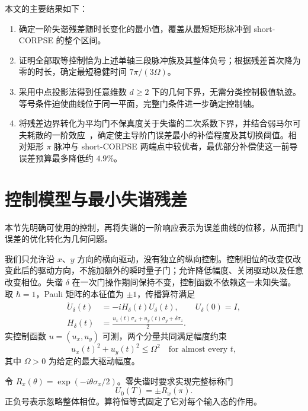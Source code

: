 \documentclass[12pt]{iopjournal}
\theoremstyle{definition}
\begin{document}
本文的主要结果如下：
\begin{enumerate}
\rightskip=0pt plus1fil
\item 确定一阶失谐残差随时长变化的最小值，覆盖从最短矩形脉冲到 short-CORPSE 的整个区间。
\item 证明全部取等控制恰为上述单轴三段脉冲族及其整体负号；根据残差首次降为零的时长，确定最短稳健时间 $7\pi/(3\Omega)$。
\item 采用中点投影法得到任意维数 $d\ge2$ 下的几何下界，无需分类控制极值轨迹。等号条件迫使曲线位于同一平面，完整门条件进一步确定控制轴。
\item 将残差边界转化为平均门不保真度关于失谐的二次系数下界，并结合弱马尔可夫耗散的一阶效应~\cite{abad2022}，确定使主导阶门误差最小的补偿程度及其切换阈值。相对矩形 $\pi$ 脉冲与 short-CORPSE 两端点中较优者，最优部分补偿使这一前导误差预算最多降低约 $4.9\%$。
\end{enumerate}

\section{控制模型与最小失谐残差}
\label{sec:model}

本节先明确可使用的控制，再将失谐的一阶响应表示为误差曲线的位移，从而把门误差的优化转化为几何问题。

我们只允许沿 $x$、$y$ 方向的横向驱动，没有独立的纵向控制。控制相位的改变仅改变此后的驱动方向，不施加额外的瞬时量子门；允许降低幅度、关闭驱动以及任意改变相位。失谐 $\delta$ 在一次门操作期间保持不变，控制函数不依赖这一未知失谐。取 $\hbar=1$，Pauli 矩阵的本征值为 $\pm1$，传播算符满足
\begin{equation}
 \begin{aligned}
 \dot U_\delta(t)&=-iH_\delta(t)U_\delta(t),\qquad U_\delta(0)=I,\\
 H_\delta(t)&=\frac{u_x(t)\sigma_x+u_y(t)\sigma_y+\delta\sigma_z}{2}.
 \end{aligned}
 \label{eq:dynamics}
\end{equation}
实控制函数 $u=(u_x,u_y)$ 可测，两个分量共同满足幅度约束
\begin{equation}
 u_x(t)^2+u_y(t)^2\le\Omega^2
 \quad\text{for almost every }t,
 \label{eq:disk}
\end{equation}
其中 $\Omega>0$ 为给定的最大驱动幅度。

令 $R_x(\theta)=\exp(-i\theta\sigma_x/2)$。零失谐时要求实现完整标称门
\begin{equation}
 U_0(T)=\pm R_x(\pi).
 \label{eq:target}
\end{equation}
正负号表示忽略整体相位。算符恒等式固定了它对每个输入态的作用。
\end{document}

